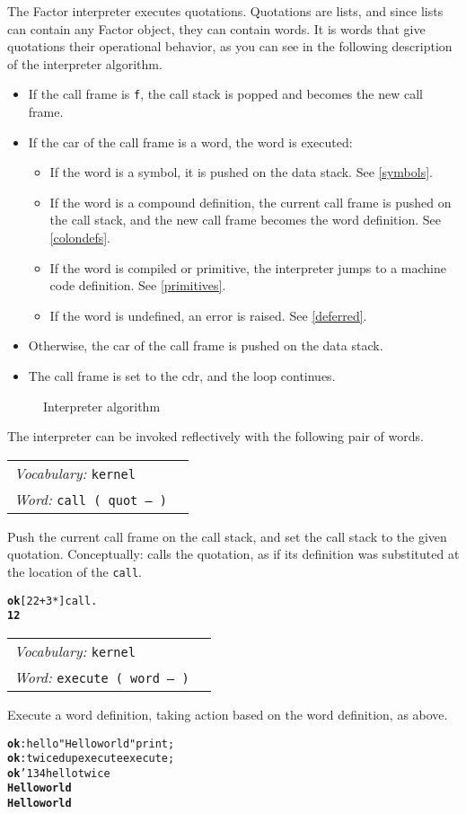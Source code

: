 \documentclass{book}
\newcommand{\bs}{\char'134}
\newcommand{\vocabulary}[1]{\emph{Vocabulary:} \texttt{#1}&\\}
\newcommand{\ordinaryword}[2]{\index{\texttt{#1}}\emph{Word:} \texttt{#2}&\\}
\newcommand{\wordtable}[1]{

\begin{tabularx}{12cm}[t]{lX}
\hline
#1
\hline
\end{tabularx}

}
\begin{document}
The Factor interpreter executes quotations. Quotations are lists, and since lists can contain any Factor object, they can contain words. It is words that give quotations their operational behavior, as you can see in the following description of the interpreter algorithm.

\begin{itemize}
\item If the call frame is \texttt{f}, the call stack is popped and becomes the new call frame.
\item If the car of the call frame is a word, the word is executed:
\begin{itemize}
\item If the word is a symbol, it is pushed on the data stack. See \ref{symbols}.
\item If the word is a compound definition, the current call frame is pushed on the call stack, and the new call frame becomes the word definition. See \ref{colondefs}.
\item If the word is compiled or primitive, the interpreter jumps to a machine code definition. See \ref{primitives}.
\item If the word is undefined, an error is raised. See \ref{deferred}.
\end{itemize}
\item Otherwise, the car of the call frame is pushed on the data stack.
\item The call frame is set to the cdr, and the loop continues.
\end{itemize}

\begin{figure}
\caption{Interpreter algorithm}
\begin{center}
\end{center}
\end{figure}

The interpreter can be invoked reflectively with the following pair of words.
\wordtable{
\vocabulary{kernel}
\ordinaryword{call}{call ( quot -- )}
}
Push the current call frame on the call stack, and set the call stack to the given quotation. Conceptually: calls the quotation, as if its definition was substituted at the location of the \texttt{call}.
\begin{alltt}
\textbf{ok} [ 2 2 + 3 * ] call .
\textbf{12}
\end{alltt}
\wordtable{
\vocabulary{kernel}
\ordinaryword{execute}{execute ( word -- )}
}
Execute a word definition, taking action based on the word definition, as above.
\begin{alltt}
\textbf{ok} : hello "Hello world" print ;
\textbf{ok} : twice dup execute execute ;
\textbf{ok} \bs hello twice
\textbf{Hello world}
\textbf{Hello world}
\end{alltt}
\end{document}
